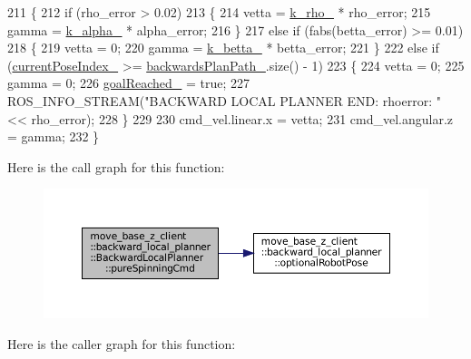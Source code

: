 \begin{DoxyCode}
211 \{
212     \textcolor{keywordflow}{if} (rho\_error > 0.02)
213     \{
214         vetta = \hyperlink{classmove__base__z__client_1_1backward__local__planner_1_1BackwardLocalPlanner_a9ae9a8c4c4663a999ba107aea9f6868d}{k\_rho\_} * rho\_error;
215         gamma = \hyperlink{classmove__base__z__client_1_1backward__local__planner_1_1BackwardLocalPlanner_ac859500c0329247de08daf864fd2d4b1}{k\_alpha\_} * alpha\_error;
216     \}
217     \textcolor{keywordflow}{else} \textcolor{keywordflow}{if} (fabs(betta\_error) >= 0.01)
218     \{
219         vetta = 0;
220         gamma = \hyperlink{classmove__base__z__client_1_1backward__local__planner_1_1BackwardLocalPlanner_aa2f7fe022cdc4eb11c17f6f576c732c6}{k\_betta\_} * betta\_error;
221     \}
222     \textcolor{keywordflow}{else} \textcolor{keywordflow}{if} (\hyperlink{classmove__base__z__client_1_1backward__local__planner_1_1BackwardLocalPlanner_af304b2e7cde744ad905a1ae7889102b6}{currentPoseIndex\_} >= \hyperlink{classmove__base__z__client_1_1backward__local__planner_1_1BackwardLocalPlanner_a451add2af7d6d83a7415277311b3ed04}{backwardsPlanPath\_}.size() - 1)
223     \{
224         vetta = 0;
225         gamma = 0;
226         \hyperlink{classmove__base__z__client_1_1backward__local__planner_1_1BackwardLocalPlanner_a0a89141d3d3a8ebfb9e1d69d0d33fd49}{goalReached\_} = \textcolor{keyword}{true};
227         ROS\_INFO\_STREAM(\textcolor{stringliteral}{"BACKWARD LOCAL PLANNER END: rhoerror: "} << rho\_error);
228     \}
229 
230     cmd\_vel.linear.x = vetta;
231     cmd\_vel.angular.z = gamma;
232 \}
\end{DoxyCode}
Here is the call graph for this function\+:
\nopagebreak
\begin{figure}[H]
\begin{center}
\leavevmode
\includegraphics[width=350pt]{classmove__base__z__client_1_1backward__local__planner_1_1BackwardLocalPlanner_a3b08865dc8e19750273d971336ecba3b_cgraph}
\end{center}
\end{figure}
Here is the caller graph for this function\+:
\nopagebreak
